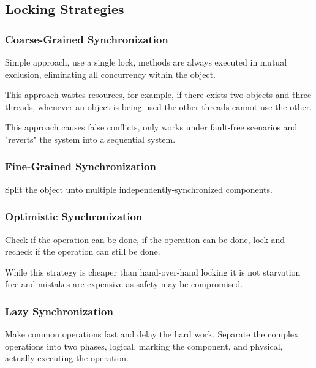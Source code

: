 \subsection{Locking Strategies}

\subsubsection{Coarse-Grained Synchronization}
Simple approach, use a single lock,
methods are always executed in mutual exclusion,
eliminating all concurrency within the object.

This approach wastes resources, for example,
if there exists two objects and three threads,
whenever an object is being used the other threads cannot use the other.

This approach causes false conflicts, only works under fault-free scenarios
and "reverts" the system into a sequential system.

\subsubsection{Fine-Grained Synchronization}
Split the object unto multiple independently-synchronized components.

\subsubsection{Optimistic Synchronization}
Check if the operation can be done,
if the operation can be done, lock and recheck if the operation can still be done.

While this strategy is cheaper than hand-over-hand locking it is not starvation free and mistakes are expensive as safety may be compromised.

\subsubsection{Lazy Synchronization}
Make common operations fast and delay the hard work.
Separate the complex operations into two phases,
logical, marking the component,
and physical, actually executing the operation.